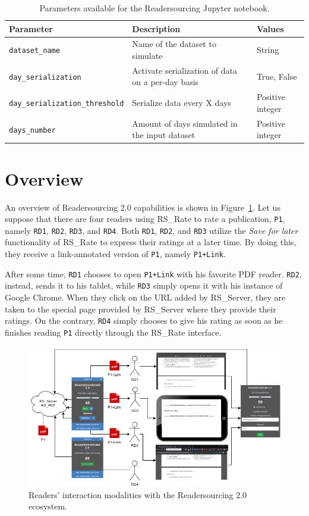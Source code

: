 \documentclass[a4paper, english]{article}
\newcommand{\rsserver}{RS\_Server\xspace}
\newcommand{\rsrate}{RS\_Rate\xspace}
\begin{document}
\begin{table}
\centering
\begin{tabular}{p{5cm}p{5.5cm}p{2.5cm}}
\toprule
\textbf{Parameter} & \textbf{Description} & \textbf{Values} \\
\midrule
\verb|dataset_name| & Name of the dataset to simulate & String \\
\verb|day_serialization| & Activate serialization of data on a per-day basis & True, False \\
\verb|day_serialization_threshold| & Serialize data every X days & Positive integer \\
\verb|days_number| & Amount of days simulated in the input dataset & Positive integer \\
\bottomrule
\end{tabular}
\caption{Parameters available for the Readersourcing Jupyter notebook.}
\label{tab:readersourcing-notebook}
\end{table}

\section{Overview}

\label{overview}

An overview of Readersourcing 2.0 capabilities is shown in Figure~\ref{fig:scenario}. Let us suppose that there are four readers using \rsrate to rate a publication, \verb|P1|, namely \verb|RD1|, \verb|RD2|, \verb|RD3|, and \verb|RD4|. Both \verb|RD1|, \verb|RD2|, and \verb|RD3| utilize the \emph{Save for later} functionality of \rsrate to express their ratings at a later time. By doing this, they receive a link-annotated version of \verb|P1|, namely \verb|P1+Link|. 

After some time, \verb|RD1| chooses to open \verb|P1+Link| with his favorite PDF reader. \verb|RD2|, instead, sends it to his tablet, while \verb|RD3| simply opens it with his instance of Google Chrome. When they click on the URL added by \rsserver, they are taken to the special page provided by \rsserver where they provide their ratings. On the contrary, \verb|RD4| simply chooses to give his rating as soon as he finishes reading \verb|P1| directly through the \rsrate interface.

\begin{figure}
\centering
\includegraphics[width=\textwidth]{figures/scenario.png}
\caption{Readers' interaction modalities with the Readersourcing 2.0 ecosystem.}\label{fig:scenario}
\end{figure}

\newpage

\nocite{*}
\printbibliography[heading=bibintoc]
\end{document}
